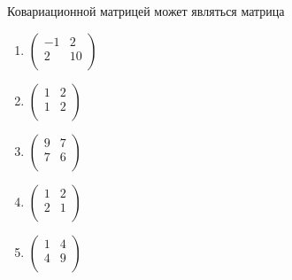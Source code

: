 \documentclass[t]{beamer}
\begin{document}
 \begin{frame} \label{5} 
\begin{block}{5} 

  Ковариационной матрицей может являться матрица
  


 \end{block} 
\begin{enumerate} 
\item[] \hyperlink{5-No}{\beamergotobutton{} $\begin{pmatrix} -1 & 2 \\ 2 & 10 \\ \end{pmatrix}$}
\item[] \hyperlink{5-No}{\beamergotobutton{} $\begin{pmatrix} 1 & 2 \\ 1 & 2 \\ \end{pmatrix}$}
\item[] \hyperlink{5-Yes}{\beamergotobutton{} $\begin{pmatrix} 9 & 7 \\ 7 & 6 \\ \end{pmatrix}$}
\item[] \hyperlink{5-No}{\beamergotobutton{} $\begin{pmatrix} 1 & 2 \\ 2 & 1 \\ \end{pmatrix}$}
\item[] \hyperlink{5-No}{\beamergotobutton{} $\begin{pmatrix} 1 & 4 \\ 4 & 9 \\ \end{pmatrix}$}
\end{enumerate} 
\end{frame} 
\end{document}
